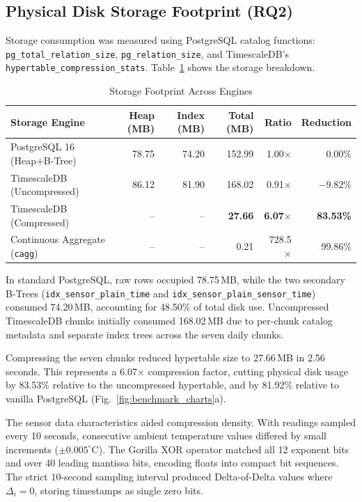 \documentclass[conference,a4paper]{IEEEtran}
\newcommand{\code}[1]{\texttt{\small #1}}
\begin{document}
\subsection{Physical Disk Storage Footprint (RQ2)}
Storage consumption was measured using PostgreSQL catalog functions: \code{pg\_total\_relation\_size}, \code{pg\_relation\_size}, and TimescaleDB's \code{hypertable\_compression\_stats}. Table~\ref{tab:storage_footprint} shows the storage breakdown.

\begin{table}[t]
\caption{Storage Footprint Across Engines}
\label{tab:storage_footprint}
\centering
\footnotesize
\setlength{\tabcolsep}{3.5pt}
\begin{tabular}{@{}lrrrrr@{}}
\toprule
\textbf{Storage Engine} & \textbf{Heap (MB)} & \textbf{Index (MB)} & \textbf{Total (MB)} & \textbf{Ratio} & \textbf{Reduction} \\ \midrule
PostgreSQL 16 (Heap+B-Tree) & 78.75 & 74.20 & 152.99 & 1.00$\times$ & 0.00\% \\
TimescaleDB (Uncompressed) & 86.12 & 81.90 & 168.02 & 0.91$\times$ & $-9.82\%$ \\
TimescaleDB (Compressed) & -- & -- & \textbf{27.66} & \textbf{6.07$\times$} & \textbf{83.53\%} \\
Continuous Aggregate (\code{cagg}) & -- & -- & 0.21 & 728.5$\times$ & 99.86\% \\ \bottomrule
\end{tabular}
\end{table}

In standard PostgreSQL, raw rows occupied 78.75\,MB, while the two secondary B-Trees (\code{idx\_sensor\_plain\_time} and \code{idx\_sensor\_plain\_sensor\_time}) consumed 74.20\,MB, accounting for 48.50\% of total disk use. Uncompressed TimescaleDB chunks initially consumed 168.02\,MB due to per-chunk catalog metadata and separate index trees across the seven daily chunks.

Compressing the seven chunks reduced hypertable size to 27.66\,MB in 2.56 seconds. This represents a 6.07$\times$ compression factor, cutting physical disk usage by 83.53\% relative to the uncompressed hypertable, and by 81.92\% relative to vanilla PostgreSQL (Fig.~\ref{fig:benchmark_charts}a).

The sensor data characteristics aided compression density. With readings sampled every 10 seconds, consecutive ambient temperature values differed by small increments ($\pm 0.005^{\circ}\text{C}$). The Gorilla XOR operator matched all 12 exponent bits and over 40 leading mantissa bits, encoding floats into compact bit sequences. The strict 10-second sampling interval produced Delta-of-Delta values where $\Delta_i = 0$, storing timestamps as single zero bits.
\end{document}
